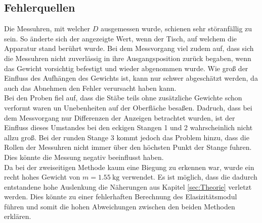 \subsection{Fehlerquellen}
\label{sec:fehlerquellen}
Die Messuhren, mit welcher $D$ ausgemessen wurde, schienen sehr störanfällig zu sein. So änderte sich der angezeigte Wert, wenn der Tisch,
auf welchem die Apparatur stand berührt wurde. Bei dem Messvorgang viel zudem auf, dass sich die Messuhren nicht zuverlässig in ihre
Ausgangsposition zurück begaben, wenn das Gewicht vorsichtig befestigt und wieder abgenommen wurde. Wie groß der Einfluss des
Aufhängen des Gewichts ist, kann nur schwer abgeschätzt werden, da auch das Abnehmen den Fehler verursacht haben kann.
\\
\noindent
Bei den Proben fiel auf, dass die Stäbe teils ohne zusätzliche Gewichte schon verformt waren un Unebenheiten auf der Oberfläche besaßen.
Dadruch, dass bei dem Messvorgang nur
Differenzen der Anzeigen betrachtet wurden, ist der Einfluss dieses Umstandes bei den eckigen Stangen 1 und 2 wahrscheinlich nicht
allzu groß. Bei der runden Stange 3 kommt jedoch das Problem hinzu, dass die Rollen der Messuhren nicht immer über den höchsten
Punkt der Stange fuhren. Dies könnte die Messung negativ beeinflusst haben.
\\
\noindent
Da bei der zweiseitigen Methode kaum eine Biegung zu erkennen war, wurde ein recht hohes Gewicht von $m=\SI{1.55}{\kilo\gram}$
verwendet. Es ist möglich, dass die dadurch entstandene hohe Auslenkung die Näherungen aus Kapitel \ref{sec:Theorie} verletzt werden.
Dies könnte zu einer fehlerhaften Berechnung des Elasizitätsmodul führen und somit die hohen Abweichungen zwischen den beiden Methoden
erklären.
